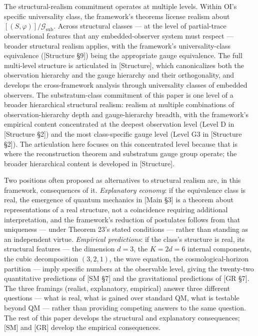 \documentclass[
]{article}
\begin{document}
The structural-realism commitment operates at multiple levels. Within
OI's specific universality class, the framework's theorems license
realism about \([(S, \varphi)] / \mathcal{G}_{\text{sub}}\). Across
structural classes --- at the level of partial-trace observational
features that any embedded-observer system must respect --- broader
structural realism applies, with the framework's universality-class
equivalence ({[}Structure §9{]}) being the appropriate gauge
equivalence. The full multi-level structure is articulated in
{[}Structure{]}, which canonicalizes both the observation hierarchy and
the gauge hierarchy and their orthogonality, and develops the
cross-framework analysis through universality classes of embedded
observers. The substratum-class commitment of this paper is one level of
a broader hierarchical structural realism: realism at multiple
combinations of observation-hierarchy depth and gauge-hierarchy breadth,
with the framework's empirical content concentrated at the deepest
observation level (Level D in {[}Structure §2{]}) and the most
class-specific gauge level (Level G3 in {[}Structure §2{]}). The
articulation here focuses on this concentrated level because that is
where the reconstruction theorem and substratum gauge group operate; the
broader hierarchical content is developed in {[}Structure{]}.

Two positions often proposed as alternatives to structural realism are,
in this framework, consequences of it. \emph{Explanatory economy}: if
the equivalence class is real, the emergence of quantum mechanics in
{[}Main §3{]} is a theorem about representations of a real structure,
not a coincidence requiring additional interpretation, and the
framework's reduction of postulates follows from that uniqueness ---
under Theorem 23's stated conditions --- rather than standing as an
independent virtue. \emph{Empirical predictions}: if the class's
structure is real, its structural features --- the dimension \(d = 3\),
the \(K = 2d = 6\) internal components, the cubic decomposition
\((3, 2, 1)\), the wave equation, the cosmological-horizon partition ---
imply specific numbers at the observable level, giving the twenty-two
quantitative predictions of {[}SM §7{]} and the gravitational
predictions of {[}GR §7{]}. The three framings (realist, explanatory,
empirical) answer three different questions --- what is real, what is
gained over standard QM, what is testable beyond QM --- rather than
providing competing answers to the same question. The rest of this paper
develops the structural and explanatory consequences; {[}SM{]} and
{[}GR{]} develop the empirical consequences.
\end{document}
